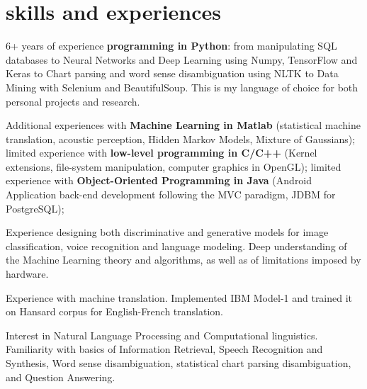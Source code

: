 \documentclass[]{cv-roald}
\begin{document}
\section*{skills and experiences}
\begin{tabitemize}
    \item 6+ years of experience \textbf{programming in Python}: from manipulating SQL databases to Neural Networks and Deep Learning using Numpy, TensorFlow and Keras to Chart parsing and word sense disambiguation using NLTK to Data Mining with Selenium and BeautifulSoup. This is my language of choice for both personal projects and research.
    \item
    Additional experiences with \textbf{Machine Learning in Matlab}
    (statistical machine translation, acoustic perception, Hidden Markov Models, Mixture of Gaussians);
    limited experience with \textbf{low-level programming in C/C++}
    (Kernel extensions, file-system manipulation, computer graphics in OpenGL);
    limited experience with \textbf{Object-Oriented Programming in Java}
    (Android Application back-end development following the MVC paradigm, JDBM for PostgreSQL);
    \item Experience designing both discriminative and generative models for image classification, voice recognition and language modeling. Deep understanding of the Machine Learning theory and algorithms, as well as of limitations imposed by hardware.
    \item Experience with machine translation. Implemented IBM Model-1 and trained it on Hansard corpus for English-French translation.
    \item Interest in Natural Language Processing and Computational linguistics. Familiarity with basics of Information Retrieval, Speech Recognition and Synthesis, Word sense disambiguation, statistical chart parsing disambiguation, and Question Answering.

\end{tabitemize}
\end{document}

